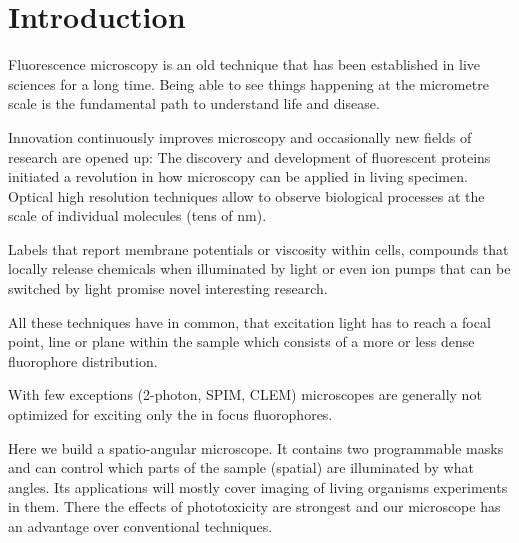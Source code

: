 \chapter{Introduction}
Fluorescence microscopy is an old technique that has been established
in live sciences for a long time. Being able to see things happening
at the micrometre scale is the fundamental path to understand life and
disease.

Innovation continuously improves microscopy and occasionally new
fields of research are opened up: The discovery and development of
fluorescent proteins initiated a revolution in how microscopy can be
applied in living specimen. Optical high resolution techniques allow
to observe biological processes at the scale of individual molecules
(tens of nm). 

Labels that report membrane potentials or viscosity within cells,
compounds that locally release chemicals when illuminated by light or
even ion pumps that can be switched by light promise novel interesting
research.

All these techniques have in common, that excitation light has to
reach a focal point, line or plane within the sample which consists of
a more or less dense fluorophore distribution.

With few exceptions (2-photon, SPIM, CLEM) microscopes are generally
not optimized for exciting only the in focus fluorophores.

Here we build a spatio-angular microscope. It contains two
programmable masks and can control which parts of the sample (spatial)
are illuminated by what angles. Its applications will mostly cover
imaging of living organisms experiments in them. There the effects of
phototoxicity are strongest and our microscope has an advantage over
conventional techniques.
